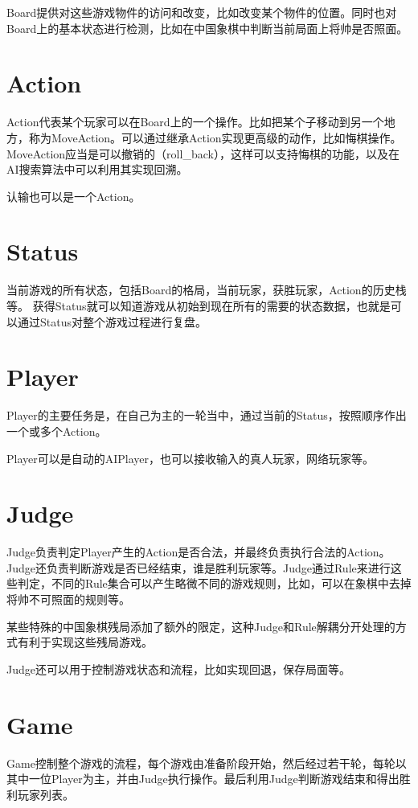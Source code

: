 \documentclass[export, 12pt, letterpaper]{ctexrep}
\begin{document}
Board提供对这些游戏物件的访问和改变，比如改变某个物件的位置。同时也对Board上的基本状态进行检测，比如在中国象棋中判断当前局面上将帅是否照面。

\section{Action}

Action代表某个玩家可以在Board上的一个操作。比如把某个子移动到另一个地方，称为MoveAction。可以通过继承Action实现更高级的动作，比如悔棋操作。MoveAction应当是可以撤销的（roll\_back），这样可以支持悔棋的功能，以及在AI搜索算法中可以利用其实现回溯。

认输也可以是一个Action。

\section{Status}

当前游戏的所有状态，包括Board的格局，当前玩家，获胜玩家，Action的历史栈等。
获得Status就可以知道游戏从初始到现在所有的需要的状态数据，也就是可以通过Status对整个游戏过程进行复盘。

\section{Player}

Player的主要任务是，在自己为主的一轮当中，通过当前的Status，按照顺序作出一个或多个Action。

Player可以是自动的AIPlayer，也可以接收输入的真人玩家，网络玩家等。

\section{Judge}

Judge负责判定Player产生的Action是否合法，并最终负责执行合法的Action。Judge还负责判断游戏是否已经结束，谁是胜利玩家等。Judge通过Rule来进行这些判定，不同的Rule集合可以产生略微不同的游戏规则，比如，可以在象棋中去掉将帅不可照面的规则等。

某些特殊的中国象棋残局添加了额外的限定，这种Judge和Rule解耦分开处理的方式有利于实现这些残局游戏。

Judge还可以用于控制游戏状态和流程，比如实现回退，保存局面等。

\section{Game}

Game控制整个游戏的流程，每个游戏由准备阶段开始，然后经过若干轮，每轮以其中一位Player为主，并由Judge执行操作。最后利用Judge判断游戏结束和得出胜利玩家列表。
\end{document}
